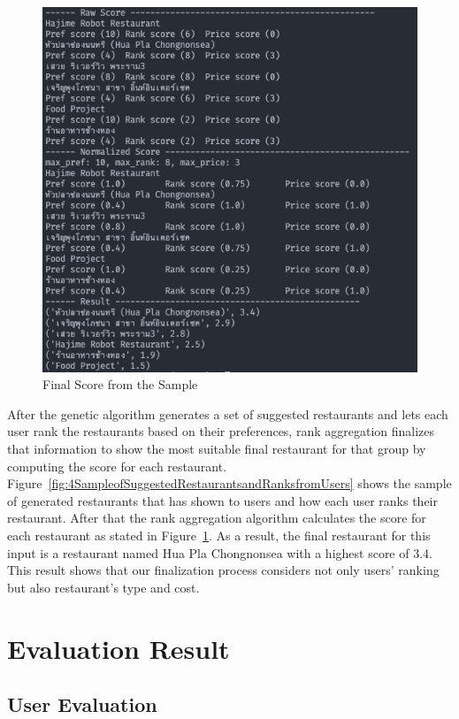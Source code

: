 \documentclass[12pt,oneside,openright,a4paper]{cpe-english-project}
\begin{document}
\begin{figure}[H]\centering
\includegraphics[width=350pt]{./images/4FinalScorefromtheSample.png}
\caption{Final Score from the Sample}\label{fig:4FinalScorefromtheSample}
\end{figure}\vspace{-24pt}

After the genetic algorithm generates a set of suggested restaurants and lets each user rank the restaurants based on their preferences, rank aggregation finalizes that information to show the most suitable final restaurant for that group by computing the score for each restaurant. Figure~\ref{fig:4SampleofSuggestedRestaurantsandRanksfromUsers} shows the sample of generated restaurants that has shown to users and how each user ranks their restaurant. After that the rank aggregation algorithm calculates the score for each restaurant as stated in Figure~\ref{fig:4FinalScorefromtheSample}. As a result, the final restaurant for this input is a restaurant named Hua Pla Chongnonsea with a highest score of 3.4. This result shows that our finalization process considers not only users’ ranking but also restaurant’s type and cost.


\section{Evaluation Result}

\subsection{User Evaluation}
\end{document}
